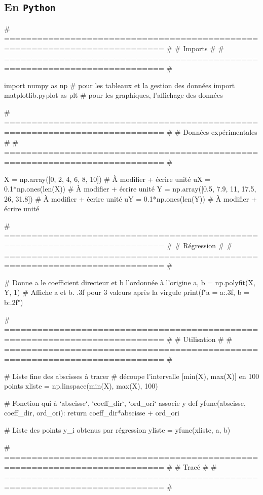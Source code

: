 \documentclass[a4paper, 12pt, garamond]{book}
\begin{document}
\subsection{En \texttt{Python}}
\begin{python}
# =========================================================================== #
#                                   Imports                                   #
# =========================================================================== #

import numpy as np               # pour les tableaux et la gestion des données
import matplotlib.pyplot as plt  # pour les graphiques, l'affichage des données

# =========================================================================== #
#                            Données expérimentales                           #
# =========================================================================== #

X = np.array([0, 2, 4, 6, 8, 10])            # À modifier + écrire unité
uX = 0.1*np.ones(len(X))                     # À modifier + écrire unité
Y = np.array([0.5, 7.9, 11, 17.5, 26, 31.8]) # À modifier + écrire unité
uY = 0.1*np.ones(len(Y))                     # À modifier + écrire unité

# =========================================================================== #
#                                  Régression                                 #
# =========================================================================== #

# Donne a le coefficient directeur et b l'ordonnée à l'origine
a, b = np.polyfit(X, Y, 1)
# Affiche a et b. .3f pour 3 valeurs après la virgule
print(f"a = {a:.3f}, b = {b:.2f}")

# =========================================================================== #
#                                 Utilisation                                 #
# =========================================================================== #

# Liste fine des abscisses à tracer
# découpe l'intervalle [min(X), max(X)] en 100 points
xliste = np.linspace(min(X), max(X), 100)

# Fonction qui à `abscisse`, `coeff_dir`, `ord_ori` associe y
def yfunc(abscisse, coeff_dir, ord_ori):
    return coeff_dir*abscisse + ord_ori

# Liste des points y_i obtenus par régression
yliste = yfunc(xliste, a, b)

# =========================================================================== #
#                                    Tracé                                    #
# =========================================================================== #


\end{python}
\end{document}
